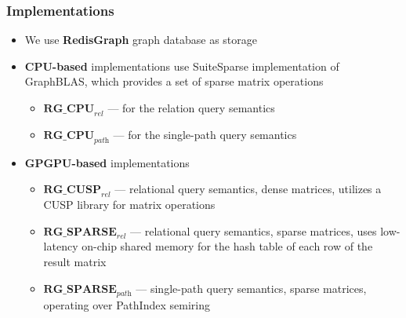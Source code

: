 \documentclass[xcolor=table]{beamer}
\begin{document}
%		
%		
%		
%		
%		



\begin{frame}[fragile] \frametitle{Implementations}

\begin{itemize}
	\item We use \textbf{RedisGraph} graph database as storage
	\pause
	\item \textbf{CPU-based} implementations use SuiteSparse implementation
	of GraphBLAS, which provides a set of sparse matrix operations
	\begin{itemize}
		\item $\textbf{RG\_CPU}_{\textit{rel}}$ --- for the relation query semantics
		\pause
		\item $\textbf{RG\_CPU}_{\textit{path}}$ --- for the single-path query semantics
	\end{itemize}
	\pause
	\item \textbf{GPGPU-based} implementations
	\begin{itemize}
		\item $\textbf{RG\_CUSP}_{\textit{rel}}$ --- relational query semantics, dense matrices, utilizes a CUSP library for matrix operations
		\pause
		\item $\textbf{RG\_SPARSE}_{\textit{rel}}$ --- relational query semantics, sparse matrices, uses low-latency on-chip shared memory for the hash table of each row of the result matrix
		\pause
		\item $\textbf{RG\_SPARSE}_{\textit{path}}$ --- single-path query semantics, sparse matrices, operating over PathIndex semiring
	\end{itemize}
\end{itemize}
\end{frame}
\end{document}
